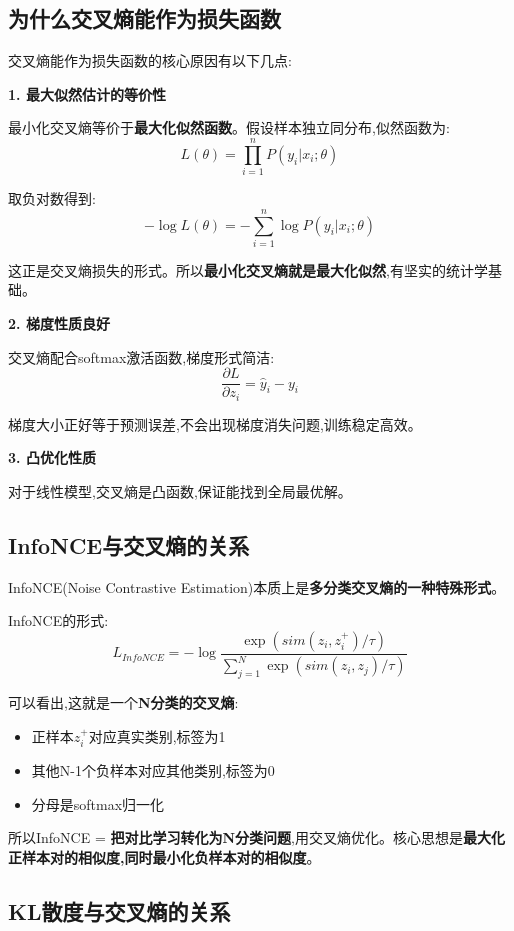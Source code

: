\documentclass[UTF8]{ctexart}
\begin{document}
\subsection{为什么交叉熵能作为损失函数}

交叉熵能作为损失函数的核心原因有以下几点:

\textbf{1. 最大似然估计的等价性}

最小化交叉熵等价于\textbf{最大化似然函数}。假设样本独立同分布,似然函数为:
$$L(\theta) = \prod_{i=1}^{n}P(y_i|x_i;\theta)$$

取负对数得到:
$$-\log L(\theta) = -\sum_{i=1}^{n}\log P(y_i|x_i;\theta)$$

这正是交叉熵损失的形式。所以\textbf{最小化交叉熵就是最大化似然},有坚实的统计学基础。

\textbf{2. 梯度性质良好}

交叉熵配合softmax激活函数,梯度形式简洁:
$$\frac{\partial L}{\partial z_i} = \hat{y}_i - y_i$$

梯度大小正好等于预测误差,不会出现梯度消失问题,训练稳定高效。

\textbf{3. 凸优化性质}

对于线性模型,交叉熵是凸函数,保证能找到全局最优解。

\subsection{InfoNCE与交叉熵的关系}

InfoNCE(Noise Contrastive Estimation)本质上是\textbf{多分类交叉熵的一种特殊形式}。

InfoNCE的形式:
$$L_{InfoNCE} = -\log\frac{\exp(sim(z_i, z_i^+)/\tau)}{\sum_{j=1}^{N}\exp(sim(z_i, z_j)/\tau)}$$

可以看出,这就是一个\textbf{N分类的交叉熵}:
\begin{itemize}
    \item 正样本$z_i^+$对应真实类别,标签为1
    \item 其他N-1个负样本对应其他类别,标签为0
    \item 分母是softmax归一化
\end{itemize}

所以InfoNCE = \textbf{把对比学习转化为N分类问题},用交叉熵优化。核心思想是\textbf{最大化正样本对的相似度,同时最小化负样本对的相似度}。

\subsection{KL散度与交叉熵的关系}
\end{document}
